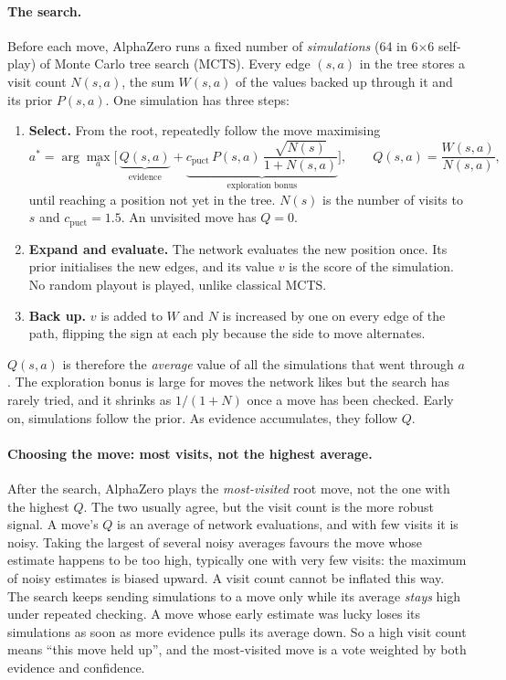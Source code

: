 \documentclass[11pt]{article}
\newcommand{\bx}[1]{#1$\times$#1}
\begin{document}
\paragraph{The search.} Before each move, AlphaZero runs a fixed number of
\emph{simulations} (64 in \bx{6} self-play) of Monte Carlo tree search (MCTS).
Every edge $(s,a)$ in the tree stores a visit count $N(s,a)$, the sum $W(s,a)$
of the values backed up through it and its prior $P(s,a)$. One simulation has
three steps:
\begin{enumerate}[leftmargin=*,itemsep=2pt]
  \item \textbf{Select.} From the root, repeatedly follow the move maximising
  \[
    a^\ast = \arg\max_a \Big[\, \underbrace{Q(s,a)}_{\text{evidence}} +
    \underbrace{c_{\text{puct}}\, P(s,a)\, \frac{\sqrt{N(s)}}{1+N(s,a)}}_{\text{exploration bonus}} \Big],
    \qquad Q(s,a) = \frac{W(s,a)}{N(s,a)},
  \]
  until reaching a position not yet in the tree. $N(s)$ is the number of
  visits to $s$ and $c_{\text{puct}}=1.5$. An unvisited move has $Q=0$.
  \item \textbf{Expand and evaluate.} The network evaluates the new position
  once. Its prior initialises the new edges, and its value $v$ is the score of
  the simulation. No random playout is played, unlike classical MCTS.
  \item \textbf{Back up.} $v$ is added to $W$ and $N$ is increased by one on
  every edge of the path, flipping the sign at each ply because the side to move
  alternates.
\end{enumerate}
$Q(s,a)$ is therefore the \emph{average} value of all the simulations that went
through $a$. The exploration bonus is large for moves the network likes but the
search has rarely tried, and it shrinks as $1/(1+N)$ once a move has been
checked. Early on, simulations follow the prior. As evidence accumulates, they
follow $Q$.

\paragraph{Choosing the move: most visits, not the highest average.} After the
search, AlphaZero plays the \emph{most-visited} root move, not the one with the
highest $Q$. The two usually agree, but the visit count is the more robust
signal. A move's $Q$ is an average of network evaluations, and with few visits
it is noisy. Taking the largest of several noisy averages favours the move whose
estimate happens to be too high, typically one with very few visits: the
maximum of noisy estimates is biased upward. A visit count cannot be inflated
this way. The search keeps sending simulations to a move only while its average
\emph{stays} high under repeated checking. A move whose early estimate was lucky
loses its simulations as soon as more evidence pulls its average down. So a high
visit count means ``this move held up'', and the most-visited move is a vote
weighted by both evidence and confidence.
\end{document}
